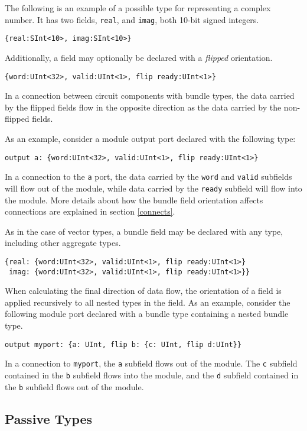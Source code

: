 \documentclass[12pt]{article}
\begin{document}
The following is an example of a possible type for representing a complex number. It has two fields, \verb|real|, and \verb|imag|, both 10-bit signed integers.
\begin{verbatim}
{real:SInt<10>, imag:SInt<10>}
\end{verbatim}

Additionally, a field may optionally be declared with a {\em flipped} orientation.
\begin{verbatim}
{word:UInt<32>, valid:UInt<1>, flip ready:UInt<1>}
\end{verbatim}
In a connection between circuit components with bundle types, the data carried by the flipped fields flow in the opposite direction as the data carried by the non-flipped fields.

As an example, consider a module output port declared with the following type:
\begin{verbatim}
output a: {word:UInt<32>, valid:UInt<1>, flip ready:UInt<1>}
\end{verbatim}
In a connection to the \verb|a| port, the data carried by the \verb|word| and \verb|valid| subfields will flow out of the module, while data carried by the \verb|ready| subfield will flow into the module. More details about how the bundle field orientation affects connections are explained in section \ref{connects}.

As in the case of vector types, a bundle field may be declared with any type, including other aggregate types. 
\begin{verbatim}
{real: {word:UInt<32>, valid:UInt<1>, flip ready:UInt<1>}
 imag: {word:UInt<32>, valid:UInt<1>, flip ready:UInt<1>}}
\end{verbatim}

When calculating the final direction of data flow, the orientation of a field is applied recursively to all nested types in the field. As an example, consider the following module port declared with a bundle type containing a nested bundle type.
\begin{verbatim}
output myport: {a: UInt, flip b: {c: UInt, flip d:UInt}}
\end{verbatim}
In a connection to \verb|myport|, the \verb|a| subfield flows out of the module. The \verb|c| subfield contained in the \verb|b| subfield flows into the module, and the \verb|d| subfield contained in the \verb|b| subfield flows out of the module.

\subsection{Passive Types} \label{passive_types}
\end{document}
